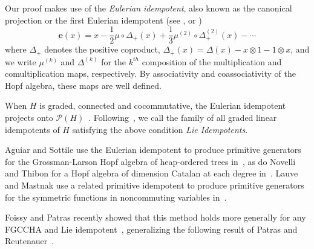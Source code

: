 \documentclass[11pt]{amsart}
\theoremstyle{definition}
\numberwithin{equation}{section}
\newcommand{\FGCCHA}{\textsf{FGCCHA}\xspace}
\newcommand{\lucas}[1]{\todo[size=\tiny,color=red!50]{#1 \\ \hfill --- Lucas}}
\begin{document}
Our proof makes use of the \emph{Eulerian idempotent}, also known as the canonical projection or the first Eulerian idempotent (see \cite{P94}, \cite[\S 1.4]{AS05cc} or \cite[\S 4.5.2]{loday2013cyclic})
\begin{equation}
\label{eq:eulerianidempotent}
\mathbf{e}(x) = x - \frac{1}{2}\mu \circ \Delta_{+}(x) + \frac{1}{3} \mu^{(2)} \circ \Delta_{+}^{(2)}(x) - \cdots 
\end{equation}
where $\Delta_{+}$ denotes the positive coproduct, $\Delta_{+}(x) = \Delta(x) - x \otimes 1 - 1 \otimes x$,
and we write $\mu^{(k)}$ and $\Delta^{(k)}$ for the $k^{th}$
composition of the multiplication and comultiplication maps, respectively.
By associativity and coassociativity of the Hopf algebra, these maps are well defined.

When $H$ is graded, connected and cocommutative, the Eulerian idempotent projects onto $\mathcal{P}(H)$~\cite[Theorem 9.4]{S94}.
Following~\cite{P99}, we call the family of all graded linear idempotents of $H$ satisfying the above condition \emph{Lie Idempotents}.

Aguiar and Sottile use the Eulerian idempotent to produce primitive generators for the Grossman-Larson
Hopf algebra of heap-ordered trees in~\cite{AS05cc},
as do Novelli and Thibon for a Hopf algebra of dimension Catalan at each degree in~\cite[\S 5]{NT05}.
Lauve and Mastnak use a related primitive idempotent to produce primitive generators for
the symmetric functions in noncommuting variables in~\cite{LM11}.  

Foissy and Patras recently showed that this method holds more generally for any \FGCCHA and Lie idempotent~\cite{FP24}, generalizing the following result of Patras and Reutenauer~\cite{PR04}.
\end{document}

